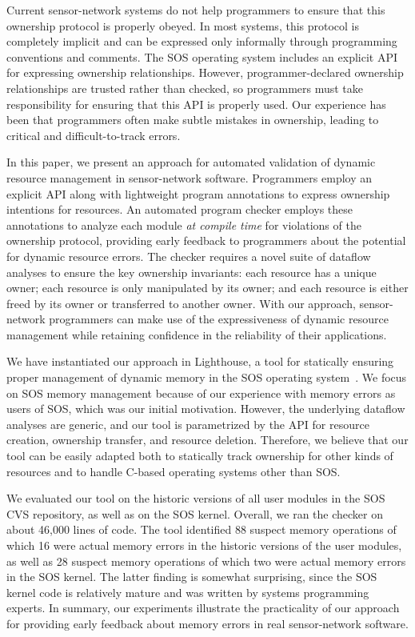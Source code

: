 Current sensor-network systems do not help programmers to ensure that
this ownership protocol is properly obeyed.  In most systems, this
protocol is completely implicit and can be expressed only informally
through programming conventions and comments.  The SOS operating
system includes an explicit API for expressing ownership
relationships.  However, programmer-declared ownership relationships
are trusted rather than checked, so programmers must take responsibility for
ensuring that this API is properly used.  Our experience has been that
programmers often make subtle mistakes in ownership,
leading to critical and difficult-to-track errors.  

In this paper, we present an approach for automated validation of dynamic
resource management in sensor-network software.  Programmers employ an
explicit API along with lightweight program annotations to express
ownership intentions for resources.  An automated program checker employs these
annotations to analyze each module {\em
at compile time} for violations of the ownership protocol, providing
early feedback to programmers about the potential for dynamic resource
errors.  The checker requires a novel suite of dataflow analyses to ensure
the key ownership invariants:  each resource has a unique owner; each
resource is only manipulated by its owner; and each resource is either
freed by its owner or transferred to another owner.  With our approach,
sensor-network programmers can make use of the expressiveness of
dynamic resource management while retaining confidence in the
reliability of their applications.

We have instantiated our approach in Lighthouse, a tool for statically ensuring
proper management of dynamic memory in the SOS operating
system~\cite{sos}. 
We focus on SOS memory management because of our experience with
memory errors as users of SOS, which was our initial motivation.
However, the underlying dataflow analyses are generic, and our tool is
parametrized by the API for resource creation, ownership transfer, and
resource deletion.  Therefore, we believe that our tool can be easily
adapted both to statically track ownership for other kinds of
resources and to handle C-based operating systems other than SOS.

We evaluated our tool on the historic versions of all user modules in
the SOS CVS repository, as well as on the SOS kernel.  Overall, we ran
the checker on about 46,000 lines of code.  The tool identified 88
suspect memory operations of which 16 were actual memory errors in the
historic versions of the user modules, as well as 28 suspect memory
operations of which two were actual memory errors in the SOS kernel.
The latter finding is somewhat surprising, since the SOS kernel code
is relatively mature and was written by systems programming experts.
In summary, our experiments illustrate the practicality of our
approach for providing early feedback about memory errors in real
sensor-network software.

